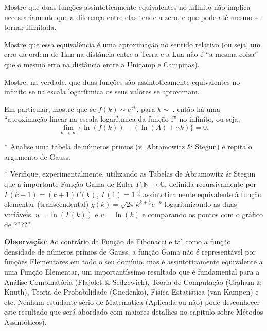 \begin{exercise}
Mostre que duas funções assintoticamente equivalentes no infinito não implica necessariamente que a diferença entre elas tende a zero, e que pode até mesmo se tornar ilimitada.

Mostre que essa equivalência é uma aproximação no sentido relativo (ou seja, um erro da ordem de 1km na distância entre a Terra e a Lua não é ``a mesma coisa'' que o mesmo erro na distância entre a Unicamp e Campinas).
\end{exercise}

\begin{exercise}
Mostre, na verdade, que duas funções são assintoticamente equivalentes no infinito se na escala logarítmica os seus valores se aproximam.
\end{exercise}

\begin{exercise}
Em particular, mostre que se \(f(k) \sim e^{\gamma k}\), para \(k \sim \), então há uma ``aproximação linear na escala logarítmica da função f'' no infinito, ou seja,
\[\displaystyle\lim_{k \to \infty} \{\ln(f(k)) - (\ln(A)+\gamma k)\} = 0.\]
\end{exercise}

\begin{exercise}\(\ast\)
Analise uma tabela de números primos (v. Abramowitz \& Stegun) e repita o argumento de Gauss.
\end{exercise}

\begin{exercise}*
Verifique, experimentalmente, utilizando as Tabelas de Abramowitz \& Stegun que a importante Função Gama de Euler \(\Gamma: \mathbb{N} \to \mathbb{C}\), definida recursivamente por \(\Gamma(k+1) = (k+1) \Gamma(k),\ \Gamma(1) = 1\) é assintoticamente equivalente à função elementar (transcendental) \(g(k) = \sqrt{2\pi} k^{k+\frac{1}{2}} e^{-k}\) logaritmizando as duas variáveis, \(u = \ln(\Gamma(k))\) e \(v = \ln(k)\) e comparando os pontos com o gráfico de {\color{red} ?????}

\textbf{Observação}: Ao contrário da Função de Fibonacci e tal como a função densidade de números primos de Gauss, a função Gama não é representável por funções Elementares em todo o seu domínio, mas é assintoticamente equivalente a uma Função Elementar, um importantíssimo resultado que é fundamental para a Análise Combinatória (Flajolet \& Sedgewick), Teoria de Computação (Graham \& Knuth), Teoria de Probabilidade (Gnedenko), Física Estatística (van Kampen) e etc. Nenhum estudante sério de Matemática (Aplicada ou não) pode desconhecer este resultado que será abordado com maiores detalhes no capítulo sobre Métodos Assintóticos).
\end{exercise}

